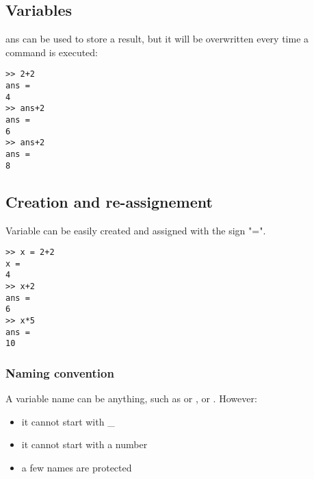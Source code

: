 \subsection{Variables}
ans can be used to store a result, but it will be overwritten every time a command is executed:

\begin{lstlisting}
>> 2+2
ans =
4
>> ans+2
ans =
6
>> ans+2
ans =
8
\end{lstlisting}

\subsection{Creation and re-assignement}

Variable can be easily created and assigned with the sign "=". 


\begin{lstlisting}
>> x = 2+2
x =
4
>> x+2
ans =
6
>> x*5
ans =
10
\end{lstlisting}


\subsubsection{Naming convention}
A variable name can be anything, such as  or  , or   .
However:
\begin{itemize}
	\item it cannot start with \_
	\item it cannot start with a number
	\item a few names are protected
\end{itemize}

